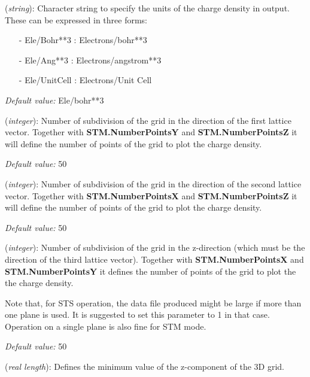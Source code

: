 \begin{description}
\itemsep 10pt
\parsep 0pt

\item[{\bf STM.DensityUnits}] ({\it string}): 
Character string to specify the units of the charge density in output. 
These can be expressed in three forms:

\begin{itemize}
\item[-] Ele/Bohr**3      : Electrons/bohr**3
\item[-] Ele/Ang**3       : Electrons/angstrom**3
\item[-] Ele/UnitCell     : Electrons/Unit Cell 
\end{itemize}

{\it Default value:} Ele/bohr**3

\item[{\bf STM.NumberPointsX}] ({\it integer}):
 Number of subdivision of the grid in the direction of the 
 first lattice vector. Together
 with {\bf STM.NumberPointsY} and {\bf STM.NumberPointsZ}
 it will define the 
 number of points of the grid to plot the charge density.

{\it Default value:} 50

\item[{\bf STM.NumberPointsY}] ({\it integer}):
 Number of subdivision of the grid in the direction
 of the second lattice vector. Together
 with {\bf STM.NumberPointsX} and {\bf STM.NumberPointsZ}
 it will define the 
 number of points of the grid to plot the charge density.

{\it Default value:} 50

\item[{\bf STM.NumberPointsZ}] ({\it integer}):
 Number of subdivision of the grid in the z-direction (which must be the
 direction of the third lattice vector). Together
 with {\bf STM.NumberPointsX} and {\bf STM.NumberPointsY}
 it defines the 
 number of points of the grid to plot the the charge density.

 Note that, for STS operation, the data file produced might be large
 if more than one plane is used. It is suggested to set this parameter
 to 1 in that case.
 Operation on a single plane is also fine for STM mode.

{\it Default value:} 50


\item[{\bf STM.MinZ}] ({\it real length}):
 Defines the minimum value of the z-component of the 3D grid.


\end{description}
